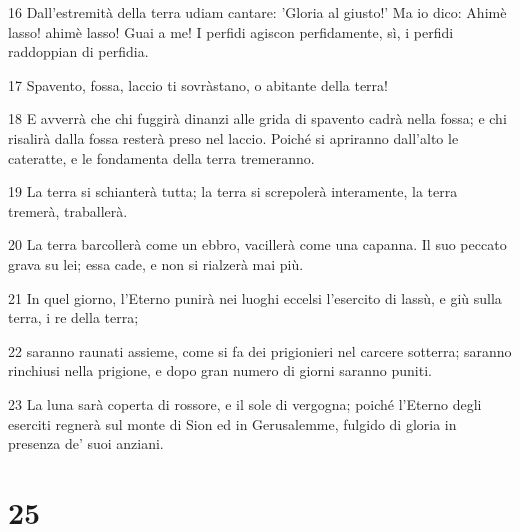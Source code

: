 \par 16 Dall'estremità della terra udiam cantare: 'Gloria al giusto!' Ma io dico: Ahimè lasso! ahimè lasso! Guai a me! I perfidi agiscon perfidamente, sì, i perfidi raddoppian di perfidia.
\par 17 Spavento, fossa, laccio ti sovràstano, o abitante della terra!
\par 18 E avverrà che chi fuggirà dinanzi alle grida di spavento cadrà nella fossa; e chi risalirà dalla fossa resterà preso nel laccio. Poiché si apriranno dall'alto le cateratte, e le fondamenta della terra tremeranno.
\par 19 La terra si schianterà tutta; la terra si screpolerà interamente, la terra tremerà, traballerà.
\par 20 La terra barcollerà come un ebbro, vacillerà come una capanna. Il suo peccato grava su lei; essa cade, e non si rialzerà mai più.
\par 21 In quel giorno, l'Eterno punirà nei luoghi eccelsi l'esercito di lassù, e giù sulla terra, i re della terra;
\par 22 saranno raunati assieme, come si fa dei prigionieri nel carcere sotterra; saranno rinchiusi nella prigione, e dopo gran numero di giorni saranno puniti.
\par 23 La luna sarà coperta di rossore, e il sole di vergogna; poiché l'Eterno degli eserciti regnerà sul monte di Sion ed in Gerusalemme, fulgido di gloria in presenza de' suoi anziani.

\chapter{25}

